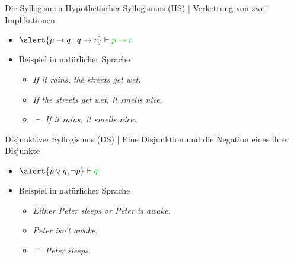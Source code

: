 \begin{frame}
  {Die Syllogismen}
  \onslide<+->
  \onslide<+->
  \alert{Hypothetischer Syllogismus} (HS) | \alert{Verkettung} von zwei \alert{Implikationen}\\
  \Halbzeile
  \begin{itemize}[<+->]
    \item $\alert{p\rightarrow q, q\rightarrow r} \vdash \gruen{p\rightarrow r}$
      \Viertelzeile
    \item Beispiel in natürlicher Sprache
      \begin{itemize}[<+->]
        \item \textit{If it rains, the streets get wet.}
        \item \textit{If the streets get wet, it smells nice.}
        \item $\vdash$ \textit{If it rains, it smells nice.}
      \end{itemize}
  \end{itemize}
  \Zeile
  \onslide<+->
  \alert{Disjunktiver Syllogismus} (DS) | Eine \alert{Disjunktion} und die \alert{Negation eines ihrer Disjunkte}\\
  \Halbzeile
  \begin{itemize}[<+->]
    \item $\alert{p\vee q, \neg p} \vdash \gruen{q}$
      \Viertelzeile
    \item Beispiel in natürlicher Sprache
      \begin{itemize}[<+->]
        \item \textit{Either Peter sleeps or Peter is awake.}
        \item \textit{Peter isn't awake.}
        \item $\vdash$ \textit{Peter sleeps.}
      \end{itemize}
  \end{itemize}
\end{frame}

